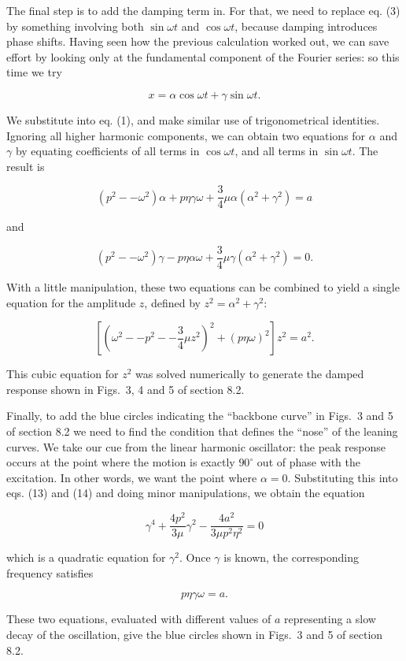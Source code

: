 
  The final step is to add the damping term in. For that, we need to replace 
  eq. (3) by something involving both $\sin \omega t$ and $\cos \omega t$, 
  because damping introduces phase shifts. Having seen how the previous 
  calculation worked out, we can save effort by looking only at the fundamental 
  component of the Fourier series: so this time we try 

  $$x=\alpha \cos \omega t + \gamma \sin \omega t . \tag{12}$$ 

  We substitute into eq. (1), and make similar use of trigonometrical 
  identities. Ignoring all higher harmonic components, we can obtain two 
  equations for $\alpha$ and $\gamma$ by equating coefficients of all terms in 
  $\cos \omega t$, and all terms in $\sin \omega t$. The result is 

  $$(p^2 -- \omega^2) \alpha +p \eta \gamma \omega +\frac{3}{4} \mu \alpha 
  (\alpha^2 + \gamma^2) = a \tag{13}$$ 

  and 

  $$(p^2 -- \omega^2) \gamma -p \eta \alpha \omega +\frac{3}{4} \mu \gamma 
  (\alpha^2 + \gamma^2) = 0 . \tag{14}$$ 

  With a little manipulation, these two equations can be combined to yield a 
  single equation for the amplitude $z$, defined by $z^2=\alpha^2 + \gamma^2$: 

  $$\left[ \left(\omega^2 -- p^2 -- \frac{3}{4} \mu z^2 \right)^2 + (p \eta 
  \omega)^2 \right] z^2 = a^2. \tag{15}$$ 

  This cubic equation for $z^2$ was solved numerically to generate the damped 
  response shown in Figs.\ 3, 4 and 5 of section 8.2. 

  Finally, to add the blue circles indicating the ``backbone curve'' in Figs.\ 
  3 and 5 of section 8.2 we need to find the condition that defines the 
  ``nose'' of the leaning curves. We take our cue from the linear harmonic 
  oscillator: the peak response occurs at the point where the motion is exactly 
  $90^\circ$ out of phase with the excitation. In other words, we want the 
  point where $\alpha = 0$. Substituting this into eqs. (13) and (14) and doing 
  minor manipulations, we obtain the equation 

  $$\gamma^4 +\dfrac{4p^2}{3 \mu} \gamma^2 -\dfrac{4a^2}{3 \mu p^2 \eta^2}=0 
  \tag{16}$$ 

  which is a quadratic equation for $\gamma^2$. Once $\gamma$ is known, the 
  corresponding frequency satisfies 

  $$p \eta \gamma \omega = a. \tag{17}$$ 

  These two equations, evaluated with different values of $a$ representing a 
  slow decay of the oscillation, give the blue circles shown in Figs.\ 3 and 5 
  of section 8.2. 